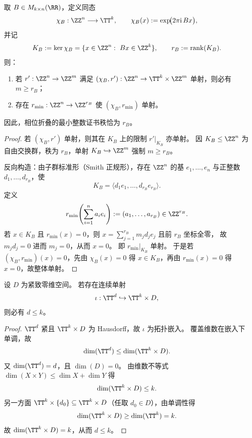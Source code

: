 \begin{theorem}[相位折叠核的最小证书秩]\label{thm:cdim-phase-fold-kernel-minimal-certificate-rank}
取 \(B\in M_{k\times n}(\RR)\)，定义同态
\[
\chi_B:\ZZ^n\longrightarrow \TT^k,\qquad
\chi_B(x):=\exp\!\bigl(2\pi\mathrm{i}\,Bx\bigr),
\]
并记
\[
K_B:=\ker \chi_B=\{x\in\ZZ^n:\ Bx\in\ZZ^k\},
\qquad
r_B:=\operatorname{rank}(K_B).
\]
则：
\begin{enumerate}
  \item 若 \(r':\ZZ^n\to \ZZ^m\) 满足 \((\chi_B,r'):\ZZ^n\to \TT^k\times\ZZ^m\) 单射，则必有 \(m\ge r_B\)；
  \item 存在 \(r_{\min}:\ZZ^n\to\ZZ^{r_B}\) 使 \((\chi_B,r_{\min})\) 单射。
\end{enumerate}
因此，相位折叠的最小整数证书秩恰为 \(r_B\)。
\end{theorem}
\begin{proof}
若 \((\chi_B,r')\) 单射，则其在 \(K_B\) 上的限制 \(r'|_{K_B}\) 亦单射。
因 \(K_B\le \ZZ^n\) 为自由交换群，秩为 \(r_B\)，单射 \(K_B\hookrightarrow \ZZ^m\) 强制 \(m\ge r_B\)。

反向构造：由子群标准形（Smith 正规形），存在 \(\ZZ^n\) 的基 \(e_1,\dots,e_n\) 与正整数 \(d_1,\dots,d_{r_B}\)，使
\[
K_B=\langle d_1e_1,\dots,d_{r_B}e_{r_B}\rangle.
\]
定义
\[
r_{\min}\!\left(\sum_{i=1}^{n}a_i e_i\right):=(a_1,\dots,a_{r_B})\in\ZZ^{r_B}.
\]
若 \(x\in K_B\) 且 \(r_{\min}(x)=0\)，则 \(x=\sum_{j=1}^{r_B}m_jd_j e_j\) 且前 \(r_B\) 坐标全零，
故 \(m_jd_j=0\) 进而 \(m_j=0\)，从而 \(x=0\)。
即 \(r_{\min}|_{K_B}\) 单射。
于是若 \((\chi_B,r_{\min})(x)=0\)，先由 \(\chi_B(x)=0\) 得 \(x\in K_B\)，再由 \(r_{\min}(x)=0\) 得 \(x=0\)，故整体单射。
\end{proof}

\begin{theorem}[零维账本不能替代相位圆因子]\label{thm:cdim-zero-dimensional-ledger-no-circle-replacement}
设 \(D\) 为紧致零维空间。
若存在连续单射
\[
\iota:\TT^d\hookrightarrow \TT^k\times D,
\]
则必有 \(d\le k\)。
\end{theorem}
\begin{proof}
\(\TT^d\) 紧且 \(\TT^k\times D\) 为 Hausdorff，故 \(\iota\) 为拓扑嵌入。
覆盖维数在嵌入下单调，故
\[
\dim(\TT^d)\le \dim(\TT^k\times D).
\]
又 \(\dim(\TT^d)=d\)，且 \(\dim(D)=0\)。
由维数不等式 \(\dim(X\times Y)\le \dim X+\dim Y\) 得
\[
\dim(\TT^k\times D)\le k.
\]
另一方面 \(\TT^k\times\{d_0\}\subseteq \TT^k\times D\)（任取 \(d_0\in D\)），由单调性得
\[
\dim(\TT^k\times D)\ge \dim(\TT^k)=k.
\]
故 \(\dim(\TT^k\times D)=k\)，从而 \(d\le k\)。
\end{proof}

